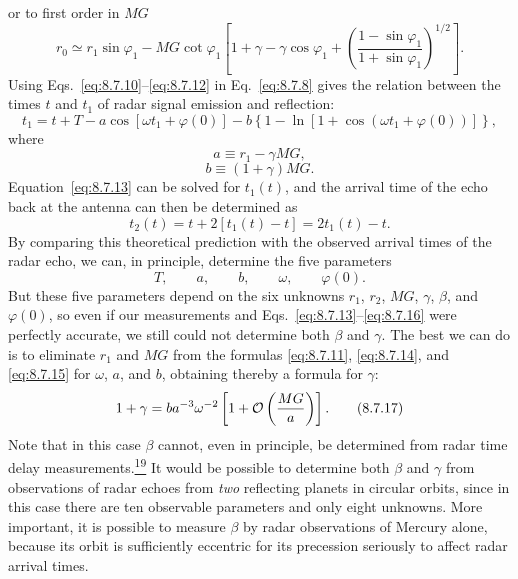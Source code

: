 or to first order in \(MG\)
\begin{equation}
  r_0
  \simeq
  r_1\sin\varphi_1
  -MG\cot\varphi_1
  \left[
    1+\gamma-\gamma\cos\varphi_1
    +\left(
      \frac{1-\sin\varphi_1}{1+\sin\varphi_1}
    \right)^{1/2}
  \right].
  \tag{8.7.12}\label{eq:8.7.12}
\end{equation}
Using Eqs.~\eqref{eq:8.7.10}--\eqref{eq:8.7.12} in
Eq.~\eqref{eq:8.7.8} gives the relation between the times \(t\) and \(t_1\)
of radar signal emission and reflection:
\begin{equation}
  t_1
  =
  t+T-a\cos[\omega t_1+\varphi(0)]
  -b\left\{1-\ln[1+\cos(\omega t_1+\varphi(0))]\right\},
  \tag{8.7.13}\label{eq:8.7.13}
\end{equation}
where
\begin{equation}
  a\equiv r_1-\gamma MG,
  \tag{8.7.14}\label{eq:8.7.14}
\end{equation}
\begin{equation}
  b\equiv(1+\gamma)MG.
  \tag{8.7.15}\label{eq:8.7.15}
\end{equation}
Equation~\eqref{eq:8.7.13} can be solved for \(t_1(t)\), and the arrival
time of the echo back at the antenna can then be determined as
\begin{equation}
  t_2(t)=t+2[t_1(t)-t]=2t_1(t)-t.
  \tag{8.7.16}\label{eq:8.7.16}
\end{equation}
By comparing this theoretical prediction with the observed arrival times
of the radar echo, we can, in principle, determine the five parameters
\[
  T,\qquad a,\qquad b,\qquad\omega,\qquad\varphi(0).
\]
But these five parameters depend on the six unknowns \(r_1\), \(r_2\),
\(MG\), \(\gamma\), \(\beta\), and \(\varphi(0)\), so even if our
measurements and Eqs.~\eqref{eq:8.7.13}--\eqref{eq:8.7.16} were perfectly
accurate, we still could not determine both \(\beta\) and \(\gamma\). The
best we can do is to eliminate \(r_1\) and \(MG\) from the formulas
\eqref{eq:8.7.11}, \eqref{eq:8.7.14}, and \eqref{eq:8.7.15} for
\(\omega\), \(a\), and \(b\), obtaining thereby a formula for \(\gamma\):
\begin{equation}
  1+\gamma
  =
  ba^{-3}\omega^{-2}
  \left[1+\mathcal{O}\left(\frac{MG}{a}\right)\right].
  \tag{8.7.17}\label{eq:8.7.17}
\end{equation}
Note that in this case \(\beta\) cannot, even in principle, be determined
from radar time delay measurements.\hyperref[ch8-ref-19]{\textsuperscript{19}}
It would be possible to determine both \(\beta\) and \(\gamma\) from
observations of radar echoes from \emph{two} reflecting planets in circular
orbits, since in this case there are ten observable parameters and only
eight unknowns. More important, it is possible to measure \(\beta\) by
radar observations of Mercury alone, because its orbit is sufficiently
eccentric for its precession seriously to affect radar arrival times.
